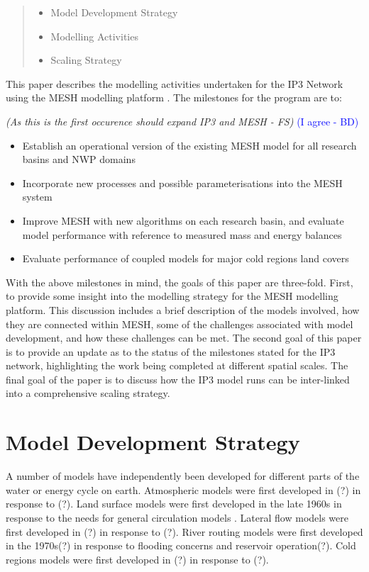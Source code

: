 \documentclass[hess]{copernicus}
\begin{document}
\begin{abstract}
\begin{itemize}
	\item Model Development Strategy
	\item Modelling Activities
	\item Scaling Strategy
\end{itemize}
\end{abstract}



\introduction
This paper describes the modelling activities undertaken for the IP3 Network using the MESH modelling platform \citep{pietroniro_etal:2007}. The milestones for the program are to:

{\em (As this is the first occurence should expand IP3 and MESH - FS)}
\textcolor{blue}{ (I agree - BD)}

\begin{itemize}
	\item Establish an operational version of the existing MESH model for all research basins and NWP domains
	\item Incorporate new processes and possible parameterisations into the MESH system
	\item Improve MESH with new algorithms on each research basin, and evaluate model performance with reference to measured mass and energy balances
	\item Evaluate performance of coupled models for major cold regions land covers
\end{itemize}

With the above milestones in mind, the goals of this paper are three-fold. First, to provide some insight into the modelling strategy for the MESH modelling platform. This discussion includes a brief description of the models involved, how they are connected within MESH, some of the challenges associated with model development, and how these challenges can be met. The second goal of this paper is to provide an update as to the status of the milestones stated for the IP3 network, highlighting the work being completed at different spatial scales. The final goal of the paper is to discuss how the IP3 model runs can be inter-linked into a comprehensive scaling strategy.

\section{Model Development Strategy}
A number of models have independently been developed for different parts of the water or energy cycle on earth. Atmospheric models were first developed in (?) in response to (?). Land surface models were first developed in the late 1960s in response to the needs for general circulation models \citep{manabe:1969}. Lateral flow models were first developed in (?) in response to (?). River routing models were first developed in the 1970s(?) in response to flooding concerns and reservoir operation(?). Cold regions models were first developed in (?) in response to (?).
\end{document}
